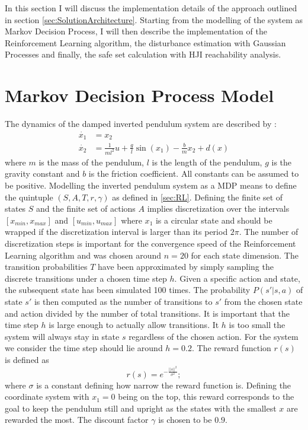 \documentclass[../main.tex]{subfiles}
\begin{document}
In this section I will discuss the implementation details of the approach outlined in section \ref{sec:SolutionArchitecture}. Starting from the modelling of the system as Markov Decision Process, I will then describe the implementation of the Reinforcement Learning algorithm, the disturbance estimation with Gaussian Processes and finally, the safe set calculation with HJI reachability analysis.
\section{Markov Decision Process Model}\label{sec:implementation_MDP}
The dynamics of the damped inverted pendulum system are described by \cite{doya2000reinforcement}:
\begin{align}
    \dot{x_1} &= x_2\\
    \dot{x_2} &= \frac{1}{ml^2}u+\frac{g}{l}\sin(x_1)-\frac{b}{m}x_2+d(x)
\end{align}
where $m$ is the mass of the pendulum, $l$ is the length of the pendulum, $g$ is the gravity constant and $b$ is the friction coefficient. All constants can be assumed to be positive. 
Modelling the inverted pendulum system as a MDP means to define the quintuple $(S,A,T,r,\gamma)$ as defined in \ref{sec:RL}. Defining the finite set of states $S$ and the finite set of actions $A$ implies discretization over the intervals $[x_{min}, x_{max}]$ and $[u_{min}, u_{max}]$ where $x_1$ is a circular state and should be wrapped if the discretization interval is larger than its period $2\pi$. The number of discretization  steps is important for the convergence speed of the Reinforcement Learning algorithm and was chosen around $n = 20$ for each state dimension.
The transition probabilities $T$ have been approximated by simply sampling the discrete transitions under a chosen time step $h$. Given a specific action and state, the subsequent state has been simulated 100 times. The probability $P(s'|s,a)$ of state $s'$ is then computed as the number of transitions to $s'$ from the chosen state and action divided by the number of total transitions. It is important that the time step $h$ is large enough to actually allow transitions. It $h$ is too small the system will always stay in state $s$ regardless of the chosen action. For the system we consider the time step should lie around $h = 0.2$. The reward function $r(s)$ is defined as
\begin{equation}
    r(s) = e^{-\frac{||s||^2}{\sigma^2}};
\end{equation}
where $\sigma$ is a constant defining how narrow the reward function is. Defining the coordinate system with $x_1 = 0$ being on the top, this reward corresponds to the goal to keep the pendulum still and upright as the states with the smallest $x$ are rewarded the most. The discount factor $\gamma$ is chosen to be $0.9$.
\end{document}
